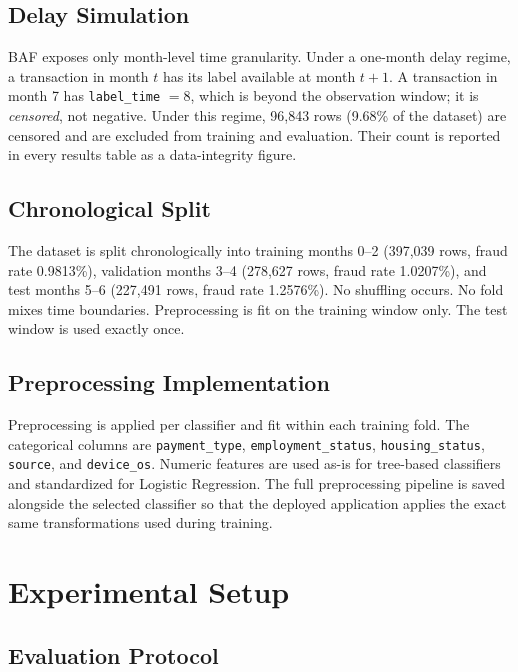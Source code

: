 \documentclass[conference]{IEEEtran}
\begin{document}
\subsection{Delay Simulation}

BAF exposes only month-level time granularity. Under a one-month delay
regime, a transaction in month $t$ has its label available at month
$t+1$. A transaction in month 7 has \texttt{label\_time} $=8$, which is
beyond the observation window; it is \emph{censored}, not negative. Under
this regime, 96,843 rows (9.68\% of the dataset) are censored and are
excluded from training and evaluation. Their count is reported in every
results table as a data-integrity figure.

\subsection{Chronological Split}

The dataset is split chronologically into training months 0--2 (397,039
rows, fraud rate 0.9813\%), validation months 3--4 (278,627 rows, fraud
rate 1.0207\%), and test months 5--6 (227,491 rows, fraud rate 1.2576\%).
No shuffling occurs. No fold mixes time boundaries. Preprocessing is fit on
the training window only. The test window is used exactly once.

\subsection{Preprocessing Implementation}

Preprocessing is applied per classifier and fit within each training fold.
The categorical columns are \texttt{payment\_type},
\texttt{employment\_status}, \texttt{housing\_status}, \texttt{source}, and
\texttt{device\_os}. Numeric features are used as-is for tree-based
classifiers and standardized for Logistic Regression. The full
preprocessing pipeline is saved alongside the selected classifier so that
the deployed application applies the exact same transformations used
during training.

\section{Experimental Setup}

\subsection{Evaluation Protocol}
\end{document}
